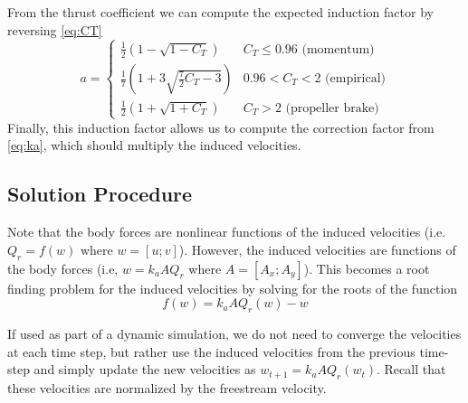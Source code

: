 \documentclass{article}
\begin{document}
From the thrust coefficient we can compute the expected induction factor by reversing \eqref{eq:CT}
\begin{equation}
a =
\begin{cases}
\frac{1}{2}\left(1 - \sqrt{1 - C_T}\right)  & C_T \leq 0.96 \textrm{ (momentum)}\\
\frac{1}{7}\left(1 + 3\sqrt{\frac{7}{2}C_T - 3}\right)  & 0.96 < C_T < 2 \textrm{ (empirical)}\\
\frac{1}{2}\left(1 + \sqrt{1 + C_T}\right)  & C_T > 2 \textrm{ (propeller brake)}
\end{cases}
\end{equation}
Finally, this induction factor allows us to compute the correction factor from \eqref{eq:ka}, which should multiply the induced velocities.

\subsection{Solution Procedure}

Note that the body forces are nonlinear functions of the induced velocities (i.e. $Q_r = f(w)$ where $w = [u; v]$).  However, the induced velocities are functions of the body forces (i.e, $w = k_a A Q_r$ where $A = [A_x; A_y]$).  This becomes a root finding problem for the induced velocities by solving  for the roots of the function
\begin{equation}
  f(w) = k_a A Q_r(w) - w
\end{equation}

If used as part of a dynamic simulation, we do not need to converge the velocities at each time step, but rather use the induced velocities from the previous time-step and simply update the new velocities as $w_{t+1} = k_a A Q_r(w_{t})$.  Recall that these velocities are normalized by the freestream velocity.
\end{document}
